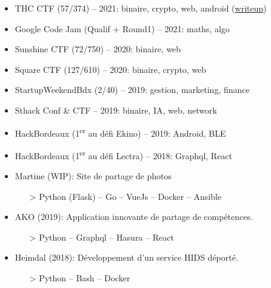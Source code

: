 \documentclass[10pt,a4paper,ragged2e,withhyper]{altacv}
\begin{document}
\begin{paracol}{2}
  \begin{itemize}
    \item THC CTF (57/374) -- 2021: binaire, crypto, web, android (\href{https://blog.tic.sh/2021/06/29/thc-writeup-mission-impossible-fr.html}{\color{PastelRed}writeup})
    \item Google Code Jam (Qualif + Round1) -- 2021: maths, algo
    \item Sunshine CTF (72/750) -- 2020: binaire, web
    \item Square CTF (127/610) -- 2020: binaire, crypto, web
    \item StartupWeekendBdx (2/40) -- 2019: gestion, marketing, finance
    \item Sthack Conf \& CTF -- 2019: binaire, IA, web, network
    \item HackBordeaux (1\textsuperscript{er} au défi Ekino) -- 2019: Android, BLE
    \item HackBordeaux (1\textsuperscript{er} au défi Lectra) -- 2018: Graphql, React
  \end{itemize}

  \begin{itemize}
    \item Martine (WIP): Site de partage de photos
      \begin{itemize}
        \item[>] Python (Flask) -- Go -- VueJs -- Docker -- Ansible
      \end{itemize}
    \item AKO (2019): Application innovante de partage de compétences.
      \begin{itemize}
        \item[>] Python -- Graphql -- Hasura -- React
      \end{itemize}
    \item Heimdal (2018): Développement d'un service HIDS déporté.
      \begin{itemize}
        \item[>] Python -- Bash -- Docker
      \end{itemize}
  \end{itemize}

\medskip

\switchcolumn




\end{paracol}
\end{document}

